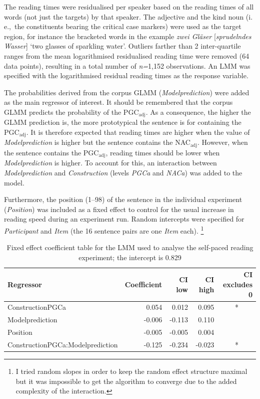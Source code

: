 \documentclass[USenglish]{article}
\newcommand{\ie}{i.\,e.,}
\newcommand{\Sub}[1]{\ensuremath{\mathrm{_{#1}}}}
\newcommand{\NACa}{NAC\Sub{adj}}
\newcommand{\PGCa}{PGC\Sub{adj}}
\begin{document}
The reading times were residualised per speaker based on the reading times of all words (not just the targets) by that speaker.
The adjective and the kind noun (\ie\ the constituents bearing the critical case markers) were used as the target region, for instance the bracketed words in the example \textit{zwei Gläser} [\textit{spru\-deln\-des Wasser}] `two glasses of sparkling water'.
Outliers farther than 2 inter-quartile ranges from the mean logarithmised residualised reading time were removed (64 data points), resulting in a total number of \textit{n=}1,152 observations.
An LMM was specified with the logarithmised residual reading times as the response variable.

The probabilities derived from the corpus GLMM (\textit{Modelprediction}) were added as the main regressor of interest.
It should be remembered that the corpus GLMM predicts the probability of the \PGCa.
As a consequence, the higher the GLMM prediction is, the more prototypical the sentence is for containing the \PGCa.
It is therefore expected that reading times are higher when the value of \textit{Modelprediction} is higher but the sentence contains the \NACa.
However, when the sentence contains the \PGCa, reading times should be lower when \textit{Modelprediction} is higher.
To account for this, an interaction between \textit{Modelprediction} and \textit{Construction} (levels \textit{PGCa} and \textit{NACa}) was added to the model.

Furthermore, the position (1--98) of the sentence in the individual experiment (\textit{Position}) was included as a fixed effect to control for the usual increase in reading speed during an experiment run.
Random intercepts were specified for \textit{Participant} and \textit{Item} (the 16 sentence pairs are one \textit{Item} each).%
\footnote{I tried random slopes in order to keep the random effect structure maximal \citep{BarrEa2013} but it was impossible to get the algorithm to converge due to the added complexity of the interaction.}

\begin{table}
  \centering
  \begin{tabular}{lrrrc}
    Regressor & \multicolumn{1}{r}{Coefficient} & \multicolumn{1}{r}{CI low} & \multicolumn{1}{r}{CI high} & \multicolumn{1}{r}{CI excludes 0} \\ \midrule
    ConstructionPGCa                 &  0.054 &  0.012 &  0.095 &  *  \\ 
    Modelprediction                  & -0.006 & -0.113 &  0.110 &     \\ 
    Position                         & -0.005 & -0.005 &  0.004 &     \\ 
    ConstructionPGCa:Modelprediction & -0.125 & -0.234 & -0.023 &  *  \\ 
  \end{tabular}
  \caption{Fixed effect coefficient table for the LMM used to analyse the self-paced reading experiment; the intercept is 0.829}
  \label{tab:exp:spr}
\end{table}
\end{document}
